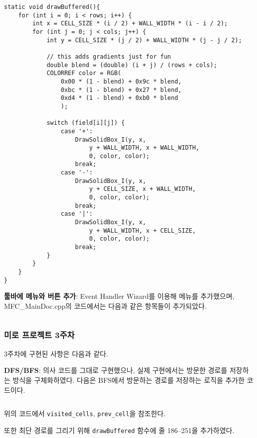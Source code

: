 \begin{verbatim}
static void drawBuffered(){
    for (int i = 0; i < rows; i++) {
        int x = CELL_SIZE * (i / 2) + WALL_WIDTH * (i - i / 2);
        for (int j = 0; j < cols; j++) {
            int y = CELL_SIZE * (j / 2) + WALL_WIDTH * (j - j / 2);
            
            // this adds gradients just for fun
            double blend = (double) (i + j) / (rows + cols);
            COLORREF color = RGB(
                0x00 * (1 - blend) + 0x9c * blend,
                0xbc * (1 - blend) + 0x27 * blend,
                0xd4 * (1 - blend) + 0xb0 * blend
                );
            
            switch (field[i][j]) {
                case '+':
                    DrawSolidBox_I(y, x,
                        y + WALL_WIDTH, x + WALL_WIDTH,
                        0, color, color);
                    break;
                case '-':
                    DrawSolidBox_I(y, x,
                        y + CELL_SIZE, x + WALL_WIDTH,
                        0, color, color);
                    break;
                case '|':
                    DrawSolidBox_I(y, x,
                        y + WALL_WIDTH, x + CELL_SIZE,
                        0, color, color);
                    break;
            }
        }
    }
}
\end{verbatim}

\textbf{툴바에 메뉴와 버튼 추가}: Event Handler Wizard를 이용해 메뉴를 추가했으며, MFC_MainDoc.cpp의 코드에서는 다음과 같은 항목들이 추가되았다.

\inputminted[xleftmargin=\parindent,linenos,firstline=31,lastline=40]{c++}{inc-sources/MainDoc.cpp}

\subsubsection{미로 프로젝트 3주차} 3주차에 구현된 사항은 다음과 같다.

\textbf{DFS/BFS}: 의사 코드를 그대로 구현했으나, 실제 구현에서는 방문한 경로를 저장하는 방식을 구체화하였다. 다음은 BFS에서 방문하는 경로를 저장하는 로직을 추가한 코드이다.

\inputminted[xleftmargin=\parindent,linenos,firstline=323,lastline=358]{c++}{inc-sources/usercode.cpp}

위의 코드에서 \texttt{visited\_cells}, \texttt{prev\_cell}을 참조한다.

또한 최단 경로를 그리기 위해 \texttt{drawBuffered} 함수에 줄 186--251을 추가하였다.